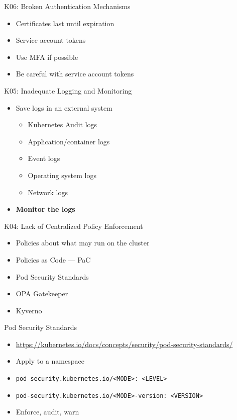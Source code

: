 \documentclass{dcpresentation}
\begin{document}
\begin{frame}{K06: Broken Authentication Mechanisms}
  \begin{itemize}
    \item Certificates last until expiration
    \item Service account tokens
    \item Use MFA if possible
    \item Be careful with service account tokens
  \end{itemize}
\end{frame}

\begin{frame}{K05: Inadequate Logging and Monitoring}
  \begin{itemize}
  \item Save logs in an external system
  \begin{itemize}
   \item Kubernetes Audit logs
   \item Application/container logs
   \item Event logs
   \item Operating system logs
   \item Network logs
  \end{itemize}
  \item \textbf{Monitor the logs}
  \end{itemize}
\end{frame}

\begin{frame}{K04: Lack of Centralized Policy Enforcement}
  \begin{itemize}
  \item Policies about what may run on the cluster
  \item Policies as Code --- PaC
  \item Pod Security Standards
  \item OPA Gatekeeper
  \item Kyverno
  \end{itemize}
\end{frame}

\begin{frame}{Pod Security Standards}
  \begin{itemize}
  \item \url{https://kubernetes.io/docs/concepts/security/pod-security-standards/}
  \item Apply to a namespace
  \item \texttt{pod-security.kubernetes.io/<MODE>: <LEVEL>}
  \item \texttt{pod-security.kubernetes.io/<MODE>-version: <VERSION>}
  \item Enforce, audit, warn
  \end{itemize}
\end{frame}
\end{document}
